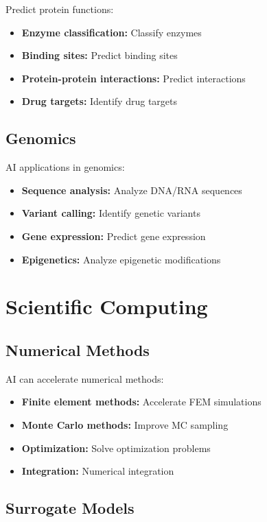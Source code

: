 Predict protein functions:
\begin{itemize}
    \item \textbf{Enzyme classification:} Classify enzymes
    \item \textbf{Binding sites:} Predict binding sites
    \item \textbf{Protein-protein interactions:} Predict interactions
    \item \textbf{Drug targets:} Identify drug targets
\end{itemize}

\subsection{Genomics}

AI applications in genomics:
\begin{itemize}
    \item \textbf{Sequence analysis:} Analyze DNA/RNA sequences
    \item \textbf{Variant calling:} Identify genetic variants
    \item \textbf{Gene expression:} Predict gene expression
    \item \textbf{Epigenetics:} Analyze epigenetic modifications
\end{itemize}

\section{Scientific Computing}

\subsection{Numerical Methods}

AI can accelerate numerical methods:
\begin{itemize}
    \item \textbf{Finite element methods:} Accelerate FEM simulations
    \item \textbf{Monte Carlo methods:} Improve MC sampling
    \item \textbf{Optimization:} Solve optimization problems
    \item \textbf{Integration:} Numerical integration
\end{itemize}

\subsection{Surrogate Models}

